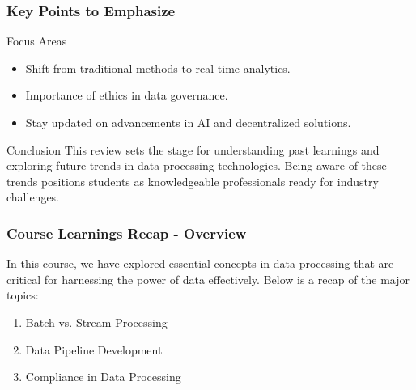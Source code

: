 \documentclass{beamer}
\begin{document}
\begin{frame}[fragile]
    \frametitle{Key Points to Emphasize}
    \begin{block}{Focus Areas}
        \begin{itemize}
            \item Shift from traditional methods to real-time analytics.
            \item Importance of ethics in data governance.
            \item Stay updated on advancements in AI and decentralized solutions.
        \end{itemize}
    \end{block}
    
    \begin{block}{Conclusion}
        This review sets the stage for understanding past learnings and exploring future trends in data processing technologies.
        Being aware of these trends positions students as knowledgeable professionals ready for industry challenges.
    \end{block}
\end{frame}

\begin{frame}[fragile]
    \frametitle{Course Learnings Recap - Overview}
    In this course, we have explored essential concepts in data processing that are critical for harnessing the power of data effectively. Below is a recap of the major topics:
    \begin{enumerate}
        \item Batch vs. Stream Processing
        \item Data Pipeline Development
        \item Compliance in Data Processing
    \end{enumerate}
\end{frame}
\end{document}
